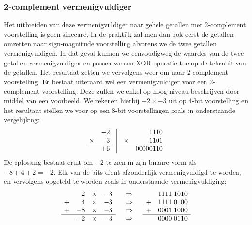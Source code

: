 \subsubsection{2-complement vermenigvuldiger}
Het uitbreiden van deze vermenigvuldiger naar gehele getallen met 2-complement voorstelling is geen sinecure. In de praktijk zal men dan ook eerst de getallen omzetten naar sign-magnitude voorstelling alvorens we de twee getallen vermenigvuldigen. In dat geval kunnen we eenvoudigweg de waardes van de twee getallen vermenigvuldigen en passen we een XOR operatie toe op de tekenbit van de getallen. Het resultaat zetten we vervolgens weer om naar 2-complement voorstelling. Er bestaat uiteraard wel een vermenigvuldiger voor een 2-complement voorstelling. Deze zullen we enkel op hoog niveau beschrijven door middel van een voorbeeld. We rekenen hierbij $-2\times -3$ uit op 4-bit voorstelling en het resultaat stellen we voor op een 8-bit voorstellingen zoals in onderstaande vergelijking:
\begin{equation}
\begin{array}{l|r}
 \begin{array}{lr}
&-2\\
\times&-3\\\hline
&+6
\end{array}&\begin{array}{lr}
&1110\\
\times&1101\\\hline
&00000110
\end{array}
\end{array}
\end{equation}
De oplossing bestaat eruit om $-2$ te zien in zijn binaire vorm als $-8+4+2=-2$. Elk van de bits dient afzonderlijk vermenigvuldigd te worden, en vervolgens opgeteld te worden zoals in onderstaande vermenigvuldiging:
\begin{equation}
\begin{array}{lcr}
\begin{array}{lrcr}
&2&\times&-3\\
+&4&\times&-3\\
+&-8&\times&-3\\\hline
&-2&\times&-3
\end{array}&\begin{array}{c}
\Rightarrow\\
\Rightarrow\\
\Rightarrow\\
\Rightarrow
\end{array}&\begin{array}{lr}
&1111\ 1010\\
+&1111\ 0100\\
+&0001\ 1000\\\hline
&0000\ 0110
\end{array}
\end{array}
\end{equation}
